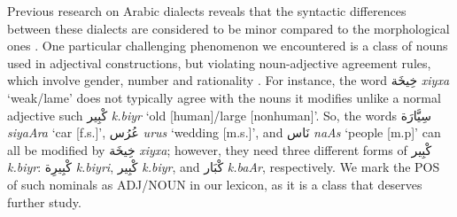 Previous research on Arabic dialects reveals that the syntactic differences between these dialects
are considered to be minor compared to the morphological ones \citep{Brustad:2000:syntax}. 
%
%
One particular challenging phenomenon we encountered is a class of nouns used in adjectival constructions, but violating noun-adjective agreement rules, which involve gender, number and rationality \citep{Alkuhlani:2011:corpus}.  For instance, the word \foreignlanguage{arabic}{خِيخَة}
{\it xiyxa{\TAMARBUTA}}  `weak/lame' does not typically agree with the nouns it modifies unlike a normal adjective such \foreignlanguage{arabic}{كْبِير}
{\it k.biyr}  `old [human]/large [nonhuman]'.  
So, the words
\foreignlanguage{arabic}{سِيَّارَة}
{\it siy{\SHADDA}aAra{\TAMARBUTA}} `car [f.s.]', 
\foreignlanguage{arabic}{عُرُس} {\it {\AYN}urus} `wedding [m.s.]', 
and \foreignlanguage{arabic}{نَاس} {\it naAs} `people [m.p]' can all be modified by \foreignlanguage{arabic}{خِيخَة}
{\it xiyxa{\TAMARBUTA}}; however, they need three different forms of \foreignlanguage{arabic}{كْبِير}
{\it k.biyr}: 
\foreignlanguage{arabic}{كْبِيرِة}
{\it k.biyri{\TAMARBUTA}},
\foreignlanguage{arabic}{كْبِير}
{\it k.biyr}, and
\foreignlanguage{arabic}{كْبَار}
{\it k.baAr}, respectively.
%
We mark the POS of such nominals as ADJ/NOUN in our lexicon, as it is a class that deserves further study.




